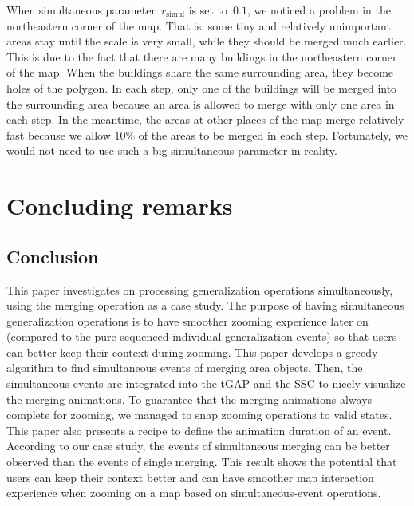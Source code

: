 \documentclass[twocolumn]{svjour3}          %
\begin{document}
When simultaneous parameter~$r_\mathrm{simul}$ is set to~$0.1$,
we noticed a problem in the northeastern corner of the map.
That is, some tiny and relatively unimportant areas stay 
until the scale is very small,
while they should be merged much earlier.
This is due to the fact that 
there are many buildings in the northeastern corner of the map.
When the buildings share the same surrounding area,
they become holes of the polygon.
In each step, only one of the buildings will be merged into the surrounding area
because an area is allowed to merge with only one area in each step.
In the meantime, the areas at other places of the map merge relatively fast
because we allow $10\%$ of the areas to be merged in each step.
Fortunately, we would not need to use such a big simultaneous parameter in reality.





\section{Concluding remarks}
\label{sec:concluding_remarks}

\subsection{Conclusion}
This paper investigates on processing generalization operations simultaneously,
using the merging operation as a case study. 
The purpose of having simultaneous generalization operations 
is to have smoother zooming experience later on 
(compared to the pure sequenced individual generalization events)
so that users can better keep their context during zooming.
This paper develops a greedy algorithm to find simultaneous events of 
merging area objects.
Then, the simultaneous events are integrated into 
the tGAP and the SSC to nicely visualize the merging animations.
To guarantee that the merging animations always complete for zooming, 
we managed to snap zooming operations to valid states.
This paper also presents a recipe 
to define the animation duration of an event.
According to our case study,
the events of simultaneous merging 
can be better observed than the events of single merging.
This result shows the potential that
users can keep their context better 
and can have smoother map interaction experience
when zooming on a map based on simultaneous-event operations.
\end{document}
